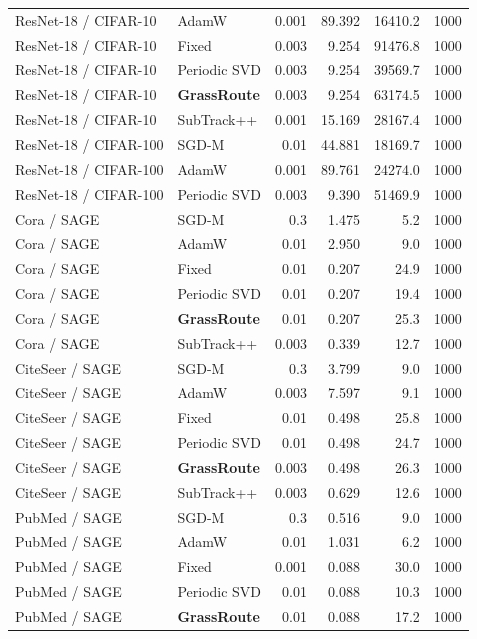 {\begin{longtable}{llrrrr}
ResNet-18 / CIFAR-10 & AdamW & 0.001 & 89.392 & 16410.2 & 1000 \\
ResNet-18 / CIFAR-10 & Fixed & 0.003 & 9.254 & 91476.8 & 1000 \\
ResNet-18 / CIFAR-10 & Periodic SVD & 0.003 & 9.254 & 39569.7 & 1000 \\
\rowcolor{oursbg}ResNet-18 / CIFAR-10 & \textbf{GrassRoute} & 0.003 & 9.254 & 63174.5 & 1000 \\
ResNet-18 / CIFAR-10 & SubTrack++ & 0.001 & 15.169 & 28167.4 & 1000 \\
ResNet-18 / CIFAR-100 & SGD-M & 0.01 & 44.881 & 18169.7 & 1000 \\
ResNet-18 / CIFAR-100 & AdamW & 0.001 & 89.761 & 24274.0 & 1000 \\
ResNet-18 / CIFAR-100 & Periodic SVD & 0.003 & 9.390 & 51469.9 & 1000 \\
Cora / SAGE & SGD-M & 0.3 & 1.475 & 5.2 & 1000 \\
Cora / SAGE & AdamW & 0.01 & 2.950 & 9.0 & 1000 \\
Cora / SAGE & Fixed & 0.01 & 0.207 & 24.9 & 1000 \\
Cora / SAGE & Periodic SVD & 0.01 & 0.207 & 19.4 & 1000 \\
\rowcolor{oursbg}Cora / SAGE & \textbf{GrassRoute} & 0.01 & 0.207 & 25.3 & 1000 \\
Cora / SAGE & SubTrack++ & 0.003 & 0.339 & 12.7 & 1000 \\
CiteSeer / SAGE & SGD-M & 0.3 & 3.799 & 9.0 & 1000 \\
CiteSeer / SAGE & AdamW & 0.003 & 7.597 & 9.1 & 1000 \\
CiteSeer / SAGE & Fixed & 0.01 & 0.498 & 25.8 & 1000 \\
CiteSeer / SAGE & Periodic SVD & 0.01 & 0.498 & 24.7 & 1000 \\
\rowcolor{oursbg}CiteSeer / SAGE & \textbf{GrassRoute} & 0.003 & 0.498 & 26.3 & 1000 \\
CiteSeer / SAGE & SubTrack++ & 0.003 & 0.629 & 12.6 & 1000 \\
PubMed / SAGE & SGD-M & 0.3 & 0.516 & 9.0 & 1000 \\
PubMed / SAGE & AdamW & 0.01 & 1.031 & 6.2 & 1000 \\
PubMed / SAGE & Fixed & 0.001 & 0.088 & 30.0 & 1000 \\
PubMed / SAGE & Periodic SVD & 0.01 & 0.088 & 10.3 & 1000 \\
\rowcolor{oursbg}PubMed / SAGE & \textbf{GrassRoute} & 0.01 & 0.088 & 17.2 & 1000 \\

\end{longtable}}
